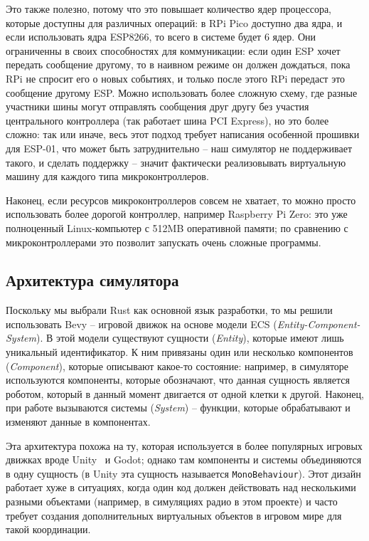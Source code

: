 \documentclass[%
]{article}
\begin{document}
Это также полезно, потому что это повышает количество ядер процессора,
которые доступны для различных операций:
в RPi Pico доступно два ядра,
и если использовать ядра ESP8266,
то всего в системе будет 6 ядер.
Они ограниченны в своих способностях для коммуникации:
если один ESP хочет передать сообщение другому,
то в наивном режиме он должен дождаться,
пока RPi не спросит его о новых событиях,
и только после этого RPi передаст это сообщение другому ESP.
Можно использовать более сложную схему, 
где разные участники шины могут отправлять сообщения друг другу
без участия центрального контроллера
(так работает шина PCI Express),
но это более сложно:
так или иначе, весь этот подход требует написания особенной прошивки
для ESP-01,
что может быть затруднительно --
наш симулятор не поддерживает такого,
и сделать поддержку -- значит фактически реализовывать виртуальную машину
для каждого типа микроконтроллеров.

Наконец, если ресурсов микроконтроллеров совсем не хватает,
то можно просто  использовать более дорогой контроллер,
например Raspberry Pi Zero:
это уже полноценный Linux-компьютер с 512MB оперативной памяти;
по сравнению с микроконтроллерами это позволит запускать
очень сложные программы.

\subsection{Архитектура симулятора}

Поскольку мы выбрали Rust как основной язык разработки,
то мы решили использовать Bevy -- игровой движок на основе модели ECS
(\emph{Entity-Component-System}).
В этой модели существуют сущности (\emph{Entity}),
которые имеют лишь уникальный идентификатор.
К ним привязаны один или несколько компонентов
(\emph{Component}), которые описывают какое-то состояние:
например, в симуляторе используются компоненты,
которые обозначают, что данная сущность является роботом,
который в данный момент двигается от одной клетки к другой.
Наконец, при работе вызываются системы (\emph{System}) --
функции, которые обрабатывают и изменяют данные
в компонентах.

Эта архитектура похожа на ту, которая используется в более популярных
игровых движках вроде Unity~\cite{unity} и Godot;
однако там компоненты и системы
объединяются в одну сущность
(в Unity эта сущность называется \texttt{MonoBehaviour}).
Этот дизайн работает хуже в ситуациях,
когда один код должен действовать над несколькими разными объектами
(например, в симуляциях радио в этом проекте)
и часто требует создания дополнительных виртуальных объектов в игровом мире
для такой координации.
\end{document}
